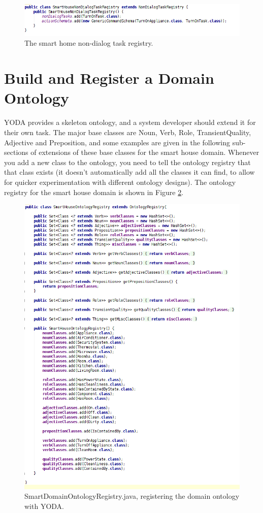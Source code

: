 \documentclass[titlepage]{article}
\begin{document}
\begin{figure}[htbp!]
\centering
\includegraphics[width=\textwidth]{NonDialogTaskRegistry}
\caption{The smart home non-dialog task registry.}
\label{fig:non_dialog_task_registry}
\end{figure}

\section{Build and Register a Domain Ontology}

YODA provides a skeleton ontology, and a system developer should extend it for their own task.
The major base classes are Noun, Verb, Role, TransientQuality, Adjective and Preposition, and some examples are given in the following sub-sections of extensions of these base classes for the smart house domain.
Whenever you add a new class to the ontology, you need to tell the ontology registry that that class exists (it doesn't automatically add all the classes it can find, to allow for quicker experimentation with different ontology designs).
The ontology registry for the smart house domain is shown in Figure \ref{fig:smart_house_ontology_registry}.

\begin{figure}[h!]
\centering
\includegraphics[width=.75\textwidth]{OntologyRegistry}
\caption{SmartDomainOntologyRegistry.java, registering the domain ontology with YODA.}
\label{fig:smart_house_ontology_registry}
\end{figure}
\end{document}
